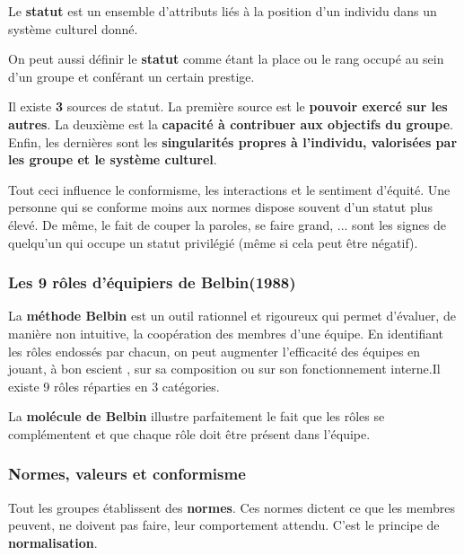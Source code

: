 \documentclass[12pt]{article}
\begin{document}
		Le \textbf{statut} est un ensemble d'attributs liés à la position d'un individu dans un système culturel donné. \newline
		
		On peut aussi définir le \textbf{statut} comme étant la place ou le rang occupé au sein d'un groupe et conférant un certain prestige.\newline
		
		Il existe \textbf{3} sources de statut. La première source est le \textbf{pouvoir exercé sur les autres}.	 La deuxième est la \textbf{capacité à contribuer aux objectifs du groupe}. Enfin, les dernières sont les \textbf{singularités propres à l'individu, valorisées par les groupe et le système culturel}. \newline
		
		Tout ceci influence le conformisme, les interactions et le sentiment d'équité. Une personne qui se conforme moins aux normes dispose souvent d'un statut plus élevé. De même, le fait de couper la paroles, se faire grand, ... sont les signes de quelqu'un qui occupe un statut privilégié (même si cela peut être négatif).
		
		\subsubsection*{Les 9 rôles d'équipiers de Belbin(1988)}		
		
		
		La \textbf{méthode Belbin} est un outil rationnel et rigoureux qui permet d'évaluer, de manière non intuitive, la coopération des membres d'une équipe. En identifiant les rôles endossés par chacun, on peut augmenter l'efficacité  des équipes en jouant, à bon escient , sur sa composition ou sur son fonctionnement interne.Il existe 9 rôles réparties en 3 catégories.\newline
		
		La \textbf{molécule de Belbin} illustre parfaitement le fait que les rôles se complémentent et que chaque rôle doit être présent dans l'équipe. \newline
		\subsubsection{Normes, valeurs et conformisme}
		 Tout les groupes établissent des \textbf{normes}. Ces normes dictent ce que les membres peuvent, ne doivent pas faire, leur comportement attendu. C'est le principe de \textbf{normalisation}. \newline
		 
\end{document}
